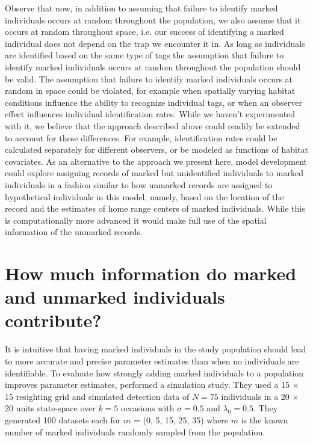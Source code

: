 Observe that now, in addition to assuming that failure to identify
marked individuals occurs at random throughout the population, we also
assume that it occurs at random throughout space, i.e. our success of
identifying a marked individual does not depend on the trap we
encounter it in. As long as individuals are identified based on the same type of tags
the assumption that failure to identify marked individuals occurs at
random throughout the population should be valid. The assumption that
failure to identify marked individuals occurs at random in space could
be violated, for example when spatially varying habitat conditions
influence the ability to recognize individual tags, or when an
observer effect influences individual identification rates. While we
haven't experimented with it, we believe that the approach
described above could readily be extended to account for these
differences. For example, identification rates could be calculated
separately for different observers, or be modeled as functions of
habitat covariates. As an alternative to the approach we present here,
model development could explore assigning records of marked but
unidentified individuals to marked individuals in a fashion similar to
how unmarked records are assigned to hypothetical individuals in this
model, namely, based on the location of the record and the estimates
of home range centers of marked individuals. While this is
computationally more advanced it would make full use of the spatial
information of the unmarked records.


\section{How much information do marked and unmarked individuals contribute?}
\label{partialID.sec.info}
It is intuitive that having marked individuals in the study population should lead to more accurate and precise parameter estimates than when no individuals are identifiable. To evaluate how strongly adding marked individuals to a population improves parameter estimates, \citet{chandler_royle:2012} performed a simulation study. They used a 15 $\times$ 15 resighting grid and
simulated detection data of $N = 75$ individuals in a 20 $\times$ 20 units state-space over $k = 5$ occasions with
$\sigma = 0.5$ and $\lambda_0 = 0.5$. They generated 100 datasets each for
$m$ = (0, 5, 15, 25, 35) where $m$ is the known number of marked individuals randomly sampled from the population.

